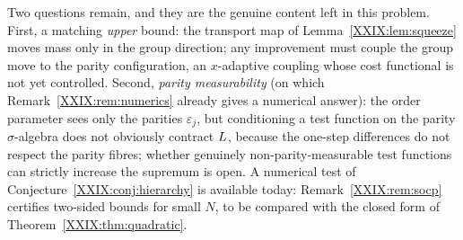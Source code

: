 Two questions remain, and they are the genuine content left in this problem. First, a
matching \emph{upper} bound: the transport map of Lemma~\ref{XXIX:lem:squeeze} moves mass only
in the group direction; any improvement must couple the group move to the parity
configuration, an $x$-adaptive coupling whose cost functional is not yet controlled.
Second, \emph{parity measurability} (on which Remark~\ref{XXIX:rem:numerics} already gives a numerical answer): the order parameter sees only the parities
$\varepsilon_j$, but conditioning a test function on the parity $\sigma$-algebra does not
obviously contract $L$, because the one-step differences do not respect the parity
fibres; whether genuinely non-parity-measurable test functions can strictly increase the
supremum is open. A numerical test of Conjecture~\ref{XXIX:conj:hierarchy} is available today:
Remark~\ref{XXIX:rem:socp} certifies two-sided bounds for small $N$, to be compared with the
closed form of Theorem~\ref{XXIX:thm:quadratic}.

